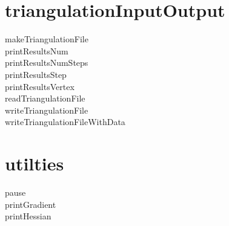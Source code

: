 \bigskip

\section{triangulationInputOutput}

\begin{description}
\item[makeTriangulationFile] 

\item[printResultsNum] 

\item[printResultsNumSteps] 

\item[printResultsStep] 

\item[printResultsVertex] 

\item[readTriangulationFile] 

\item[writeTriangulationFile] 

\item[writeTriangulationFileWithData] 
\end{description}

\bigskip

\section{utilties}

\begin{description}
\item[pause] 

\item[printGradient] 

\item[printHessian] 
\end{description}

\bigskip
